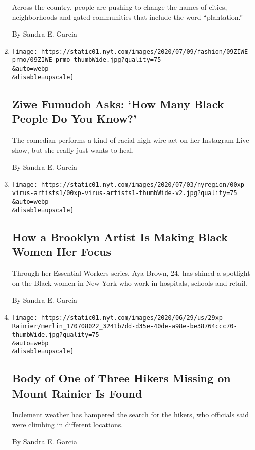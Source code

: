 \begin{enumerate}
  Across the country, people are pushing to change the names of cities,
  neighborhoods and gated communities that include the word
  ``plantation.''

  By Sandra E. Garcia
\item
  \href{/2020/07/09/style/ziwe-fumudoh-asks-how-many-black-people-do-you-know.html}{}

  \texttt{[image: https://static01.nyt.com/images/2020/07/09/fashion/09ZIWE-prmo/09ZIWE-prmo-thumbWide.jpg?quality=75\\\&auto=webp\\\&disable=upscale]}

  \hypertarget{ziwe-fumudoh-asks-how-many-black-people-do-you-know}{%
  \subsection{Ziwe Fumudoh Asks: `How Many Black People Do You
  Know?'}\label{ziwe-fumudoh-asks-how-many-black-people-do-you-know}}

  The comedian performs a kind of racial high wire act on her Instagram
  Live show, but she really just wants to heal.

  By Sandra E. Garcia
\item
  \href{/2020/07/06/nyregion/black-women-essential-workers.html}{}

  \texttt{[image: https://static01.nyt.com/images/2020/07/03/nyregion/00xp-virus-artists1/00xp-virus-artists1-thumbWide-v2.jpg?quality=75\\\&auto=webp\\\&disable=upscale]}

  \hypertarget{how-a-brooklyn-artist-is-making-black-women-her-focus}{%
  \subsection{How a Brooklyn Artist Is Making Black Women Her
  Focus}\label{how-a-brooklyn-artist-is-making-black-women-her-focus}}

  Through her Essential Workers series, Aya Brown, 24, has shined a
  spotlight on the Black women in New York who work in hospitals,
  schools and retail.

  By Sandra E. Garcia
\item
  \href{/2020/06/29/us/mt-rainier-missing-hikers.html}{}

  \texttt{[image: https://static01.nyt.com/images/2020/06/29/us/29xp-Rainier/merlin\_170708022\_3241b7dd-d35e-40de-a98e-be38764ccc70-thumbWide.jpg?quality=75\\\&auto=webp\\\&disable=upscale]}

  \hypertarget{body-of-one-of-three-hikers-missing-on-mount-rainier-is-found}{%
  \subsection{Body of One of Three Hikers Missing on Mount Rainier Is
  Found}\label{body-of-one-of-three-hikers-missing-on-mount-rainier-is-found}}

  Inclement weather has hampered the search for the hikers, who
  officials said were climbing in different locations.

  By Sandra E. Garcia
\end{enumerate}

